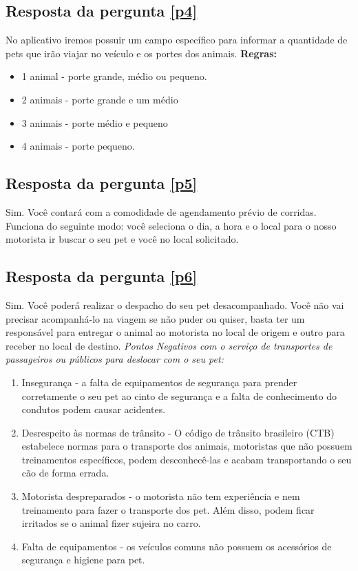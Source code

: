 \begin{apendicesenv}
\subsection{Resposta da pergunta \ref{p4}}
No aplicativo iremos possuir um campo específico para informar a quantidade de pets que irão viajar no veículo e os portes dos animais. 
\textbf{Regras:} 
\begin{itemize}
    \item 1 animal - porte grande, médio ou pequeno.
    \item 2 animais - porte grande e um médio 
    \item 3 animais - porte médio e pequeno 
    \item 4 animais - porte pequeno.
\end{itemize} 

\subsection{Resposta da pergunta \ref{p5}}
Sim. Você contará com a comodidade de agendamento prévio de corridas. Funciona do seguinte modo: você seleciona o dia, a hora e o local para o nosso motorista ir buscar o seu pet e você no local solicitado.

\subsection{Resposta da pergunta \ref{p6}}
Sim. Você poderá realizar o despacho do seu pet desacompanhado. Você não vai precisar acompanhá-lo na viagem se não puder ou quiser, basta ter um responsável para entregar o animal ao motorista no local de origem e outro para receber no local de destino. 
\textit{Pontos Negativos com o serviço de transportes de passageiros ou públicos para deslocar com o seu pet:}
\begin{enumerate}
    \item Insegurança - a falta de equipamentos de segurança para prender corretamente o seu pet ao cinto de segurança e a falta de conhecimento do condutos podem causar acidentes.
    \item Desrespeito às normas de trânsito - O código de trânsito brasileiro (CTB) estabelece normas para o transporte dos animais, motoristas que não possuem treinamentos específicos, podem desconhecê-las e acabam transportando o seu cão de forma errada. 
    \item Motorista despreparados - o motorista não tem experiência e nem treinamento para fazer o transporte dos pet. Além disso, podem ficar irritados se o animal fizer sujeira no carro. 
    \item Falta de equipamentos - os veículos comuns não possuem os acessórios de segurança e higiene para pet.
\end{enumerate}


\end{apendicesenv}
